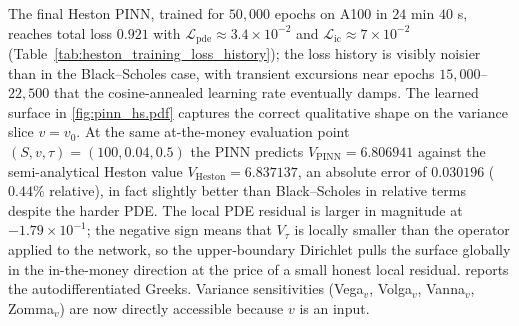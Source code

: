 The final Heston PINN, trained for $50{,}000$ epochs on A100 in $24$ min $40$ s, reaches total loss $0.921$ with $\mathcal{L}_{\mathrm{pde}}\approx 3.4\times 10^{-2}$ and $\mathcal{L}_{\mathrm{ic}}\approx 7\times 10^{-2}$ (Table~\ref{tab:heston_training_loss_history}); the loss history is visibly noisier than in the Black--Scholes case, with transient excursions near epochs $15{,}000$--$22{,}500$ that the cosine-annealed learning rate eventually damps. The learned surface in \cref{fig:pinn_hs.pdf} captures the correct qualitative shape on the variance slice $v=v_0$. At the same at-the-money evaluation point $(S,v,\tau)=(100,0.04,0.5)$ the PINN predicts $V_{\mathrm{PINN}}=6.806941$ against the semi-analytical Heston value $V_{\mathrm{Heston}}=6.837137$, an absolute error of $0.030196$ ($0.44\%$ relative), in fact slightly better than Black--Scholes in relative terms despite the harder PDE. The local PDE residual is larger in magnitude at $-1.79\times 10^{-1}$; the negative sign means that $V_\tau$ is locally smaller than the operator applied to the network, so the upper-boundary Dirichlet pulls the surface globally in the in-the-money direction at the price of a small honest local residual.  reports the autodifferentiated Greeks. Variance sensitivities (Vega$_v$, Volga$_v$, Vanna$_v$, Zomma$_v$) are now directly accessible because $v$ is an input.

